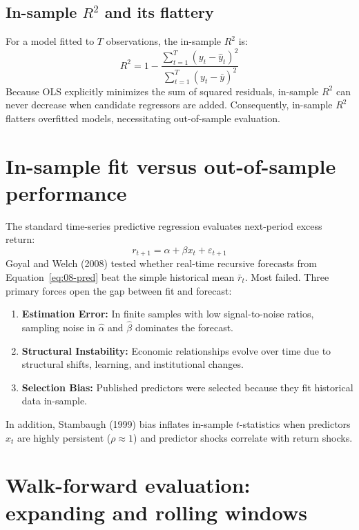 \subsection{In-sample $R^2$ and its flattery}
For a model fitted to $T$ observations, the in-sample $R^2$ is:
\begin{equation}
  R^2 = 1 - \frac{\sum_{t=1}^T (y_t - \hat{y}_t)^2}{\sum_{t=1}^T (y_t - \bar{y})^2}
  \label{eq:08-r2}
\end{equation}
Because OLS explicitly minimizes the sum of squared residuals, in-sample $R^2$ can never decrease when candidate regressors are added. Consequently, in-sample $R^2$ flatters overfitted models, necessitating out-of-sample evaluation.

\section{In-sample fit versus out-of-sample performance}
\label{sec:08-insample}

The standard time-series predictive regression evaluates next-period excess return:
\begin{equation}
  r_{t+1} = \alpha + \beta x_t + \varepsilon_{t+1}
  \label{eq:08-pred}
\end{equation}
Goyal and Welch (2008) tested whether real-time recursive forecasts from Equation~\eqref{eq:08-pred} beat the simple historical mean $\bar{r}_t$. Most failed. Three primary forces open the gap between fit and forecast:
\begin{enumerate}
  \item \textbf{Estimation Error:} In finite samples with low signal-to-noise ratios, sampling noise in $\hat{\alpha}$ and $\hat{\beta}$ dominates the forecast.
  \item \textbf{Structural Instability:} Economic relationships evolve over time due to structural shifts, learning, and institutional changes.
  \item \textbf{Selection Bias:} Published predictors were selected because they fit historical data in-sample.
\end{enumerate}
In addition, Stambaugh (1999) bias inflates in-sample $t$-statistics when predictors $x_t$ are highly persistent ($\rho \approx 1$) and predictor shocks correlate with return shocks.

\section{Walk-forward evaluation: expanding and rolling windows}
\label{sec:08-walkforward}

